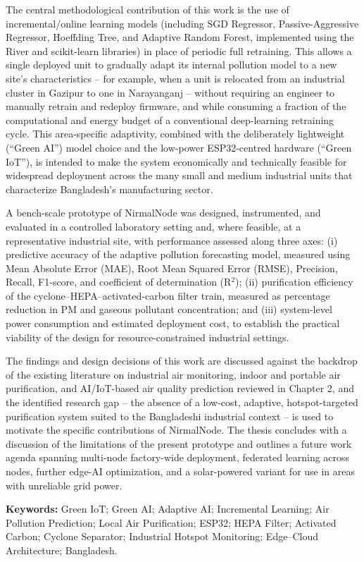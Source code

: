 The central methodological contribution of this work is the use of incremental/online learning models (including SGD Regressor, Passive-Aggressive Regressor, Hoeffding Tree, and Adaptive Random Forest, implemented using the River and scikit-learn libraries) in place of periodic full retraining. This allows a single deployed unit to gradually adapt its internal pollution model to a new site's characteristics -- for example, when a unit is relocated from an industrial cluster in Gazipur to one in Narayanganj -- without requiring an engineer to manually retrain and redeploy firmware, and while consuming a fraction of the computational and energy budget of a conventional deep-learning retraining cycle. This area-specific adaptivity, combined with the deliberately lightweight (``Green AI'') model choice and the low-power ESP32-centred hardware (``Green IoT''), is intended to make the system economically and technically feasible for widespread deployment across the many small and medium industrial units that characterize Bangladesh's manufacturing sector.

A bench-scale prototype of NirmalNode was designed, instrumented, and evaluated in a controlled laboratory setting and, where feasible, at a representative industrial site, with performance assessed along three axes: (i) predictive accuracy of the adaptive pollution forecasting model, measured using Mean Absolute Error (MAE), Root Mean Squared Error (RMSE), Precision, Recall, F1-score, and coefficient of determination (R$^2$); (ii) purification efficiency of the cyclone--HEPA--activated-carbon filter train, measured as percentage reduction in PM and gaseous pollutant concentration; and (iii) system-level power consumption and estimated deployment cost, to establish the practical viability of the design for resource-constrained industrial settings.

The findings and design decisions of this work are discussed against the backdrop of the existing literature on industrial air monitoring, indoor and portable air purification, and AI/IoT-based air quality prediction reviewed in Chapter 2, and the identified research gap -- the absence of a low-cost, adaptive, hotspot-targeted purification system suited to the Bangladeshi industrial context -- is used to motivate the specific contributions of NirmalNode. The thesis concludes with a discussion of the limitations of the present prototype and outlines a future work agenda spanning multi-node factory-wide deployment, federated learning across nodes, further edge-AI optimization, and a solar-powered variant for use in areas with unreliable grid power.

\vspace{1cm}
\noindent \textbf{Keywords:} Green IoT; Green AI; Adaptive AI; Incremental Learning; Air Pollution Prediction; Local Air Purification; ESP32; HEPA Filter; Activated Carbon; Cyclone Separator; Industrial Hotspot Monitoring; Edge--Cloud Architecture; Bangladesh.
